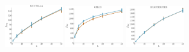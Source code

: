 \documentclass[a4paper]{report}
\newcommand{\wratio}{0.19}
\begin{document}
\includegraphics[width=\wratio\textwidth]{maxcut/GNUTELLA/fs_gnutella}\hfill
\vfill
\includegraphics[width=\wratio\textwidth]{maxcut/GPLUS/fs_gplus}\hfill
\includegraphics[width=\wratio\textwidth]{maxcut/HAMSTERSTER/fs_hamsterster}\hfill
\end{document}
